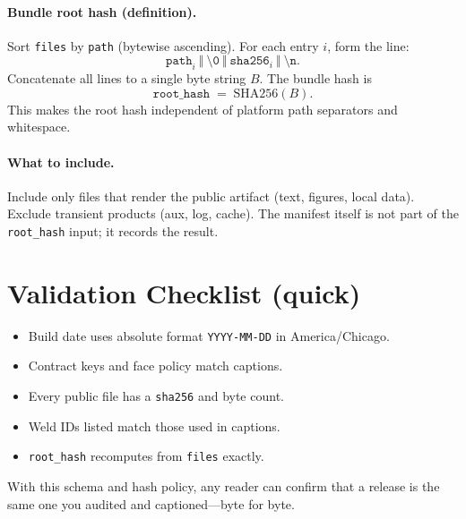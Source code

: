 \paragraph{Bundle root hash (definition).} Sort \texttt{files} by \texttt{path} (bytewise ascending). For each entry \(i\), form the line:
\[
\texttt{path}_i \ \Vert\ \texttt{\textbackslash0}\ \Vert\ \texttt{sha256}_i \ \Vert\ \texttt{\textbackslash n}.
\]
Concatenate all lines to a single byte string \(B\). The bundle hash is
\[
\texttt{root\_hash} \;=\; \mathrm{SHA256}(B).
\]
This makes the root hash independent of platform path separators and whitespace.

\paragraph{What to include.} Include only files that render the public artifact (text, figures, local data). Exclude transient products (aux, log, cache). The manifest itself is not part of the \texttt{root\_hash} input; it records the result.

\section{Validation Checklist (quick)}
\label{sec:manifest-checklist}

\begin{itemize}[leftmargin=1.25em]
  \item Build date uses absolute format \texttt{YYYY-MM-DD} in America/Chicago.
  \item Contract keys and face policy match captions.
  \item Every public file has a \texttt{sha256} and byte count.
  \item Weld IDs listed match those used in captions.
  \item \texttt{root\_hash} recomputes from \texttt{files} exactly.
\end{itemize}

\medskip
With this schema and hash policy, any reader can confirm that a release is the same one you audited and captioned—byte for byte.
